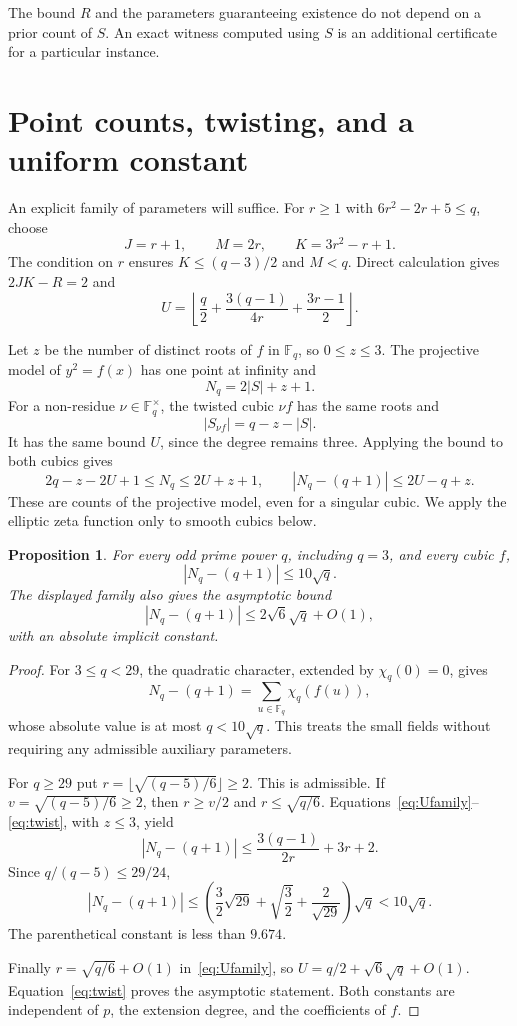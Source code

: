 \documentclass[11pt]{amsart}
\newtheorem{proposition}[theorem]{Proposition}
\theoremstyle{definition}
\theoremstyle{remark}
\newcommand{\F}{\mathbb F}
\begin{document}
The bound $R$ and the parameters guaranteeing existence do not depend on a prior count of $S$. An exact witness computed using $S$ is an additional certificate for a particular instance.

\section{Point counts, twisting, and a uniform constant}\label{sec:count}

An explicit family of parameters will suffice. For $r\ge1$ with $6r^2-2r+5\le q$, choose
\[
J=r+1,\qquad M=2r,\qquad K=3r^2-r+1.
\]
The condition on $r$ ensures $K\le(q-3)/2$ and $M<q$. Direct calculation gives $2JK-R=2$ and
\begin{equation}\label{eq:Ufamily}
U=\left\lfloor
 \frac q2+\frac{3(q-1)}{4r}+\frac{3r-1}{2}
 \right\rfloor.
\end{equation}

Let $z$ be the number of distinct roots of $f$ in $\F_q$, so $0\le z\le3$. The projective model of $y^2=f(x)$ has one point at infinity and
\[
N_q=2|S|+z+1.
\]
For a non-residue $\nu\in\F_q^\times$, the twisted cubic $\nu f$ has the same roots and
\[
|S_{\nu f}|=q-z-|S|.
\]
It has the same bound $U$, since the degree remains three. Applying the bound to both cubics gives
\begin{equation}\label{eq:twist}
2q-z-2U+1\le N_q\le2U+z+1,\qquad
|N_q-(q+1)|\le2U-q+z.
\end{equation}
These are counts of the projective model, even for a singular cubic. We apply the elliptic zeta function only to smooth cubics below.

\begin{proposition}\label{prop:uniform}
For every odd prime power $q$, including $q=3$, and every cubic $f$,
\[
|N_q-(q+1)|\le10\sqrt q.
\]
The displayed family also gives the asymptotic bound
\[
|N_q-(q+1)|\le2\sqrt6\sqrt q+O(1),
\]
with an absolute implicit constant.
\end{proposition}
\begin{proof}
For $3\le q<29$, the quadratic character, extended by $\chi_q(0)=0$, gives
\[
N_q-(q+1)=\sum_{u\in\F_q}\chi_q(f(u)),
\]
whose absolute value is at most $q<10\sqrt q$. This treats the small fields without requiring any admissible auxiliary parameters.

For $q\ge29$ put $r=\lfloor\sqrt{(q-5)/6}\rfloor\ge2$. This is admissible. If $v=\sqrt{(q-5)/6}\ge2$, then $r\ge v/2$ and $r\le\sqrt{q/6}$. Equations~\eqref{eq:Ufamily}--\eqref{eq:twist}, with $z\le3$, yield
\[
|N_q-(q+1)|\le\frac{3(q-1)}{2r}+3r+2.
\]
Since $q/(q-5)\le29/24$,
\[
|N_q-(q+1)|
\le\left(\frac32\sqrt{29}+\sqrt{\frac32}+
                 \frac2{\sqrt{29}}\right)\sqrt q
<10\sqrt q.
\]
The parenthetical constant is less than $9.674$.

Finally $r=\sqrt{q/6}+O(1)$ in~\eqref{eq:Ufamily}, so $U=q/2+\sqrt6\sqrt q+O(1)$. Equation~\eqref{eq:twist} proves the asymptotic statement. Both constants are independent of $p$, the extension degree, and the coefficients of $f$.
\end{proof}
\end{document}
